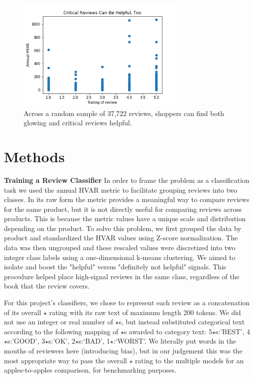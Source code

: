 \documentclass[10pt, a4paper, twocolumn]{article}
\begin{document}
\begin{figure}[ht]
\includegraphics[width=3.25in]{Annual_HVAR_by_rating_37K_rsample.png}
\caption{Across a random sample of 37,722 reviews, shoppers can find both glowing and critical reviews helpful.}
\end{figure}

\section{Methods}
\textbf{Training a Review Classifier}
In order to frame the problem as a classification task we used the annual HVAR metric to facilitate grouping reviews into two classes. In its raw form the metric provides a meaningful way to compare reviews for the same product, but it is not directly useful for comparing reviews across products. This is because the metric values have a unique scale and distribution depending on the product. To solve this problem, we first grouped the data by product and standardized the HVAR values using Z-score normalization. The data was then ungrouped and these rescaled values were discretized into two integer class labels using a one-dimensional k-means clustering. We aimed to isolate and boost the "helpful" versus "definitely not helpful" signals. This procedure helped place high-signal reviews in the same class, regardless of the book that the review covers.

For this project’s classifiers, we chose to represent each review as a concatenation of its overall $\star$ rating with its raw text of maximum length 200 tokens. We did not use an integer or real number of $\star$s, but instead substituted categorical text according to the following mapping of $\star$s awarded to category text: {5$\star$s:’BEST’, 4$\star$s:’GOOD’, 3$\star$s:’OK’, 2$\star$s:‘BAD’, 1$\star$:‘WORST’}. We literally put words in the mouths of reviewers here (introducing bias), but in our judgement this was the most appropriate way to pass the overall $\star$ rating to the multiple models for an apples-to-apples comparison, for benchmarking purposes.
\end{document}
